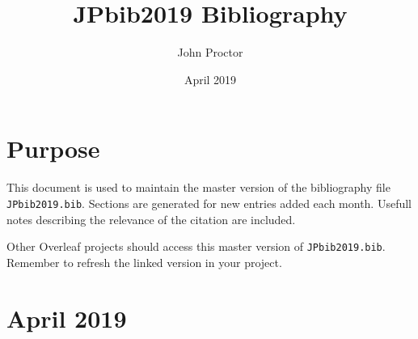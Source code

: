 \documentclass[ceqn,usenatbib,onecolumn]{mnras}
\title{JPbib2019 Bibliography}
\author{John Proctor}
\date{April 2019}
\begin{document}
\maketitle

\section{Purpose}
This document is used to maintain the master version of the bibliography file \texttt{JPbib2019.bib}. Sections are generated for new entries added each month. Usefull notes describing the relevance of the citation are included.
\par Other Overleaf projects should access this master version of \texttt{JPbib2019.bib}. Remember to refresh the linked version in your project.

\section{April 2019}
\end{document}
